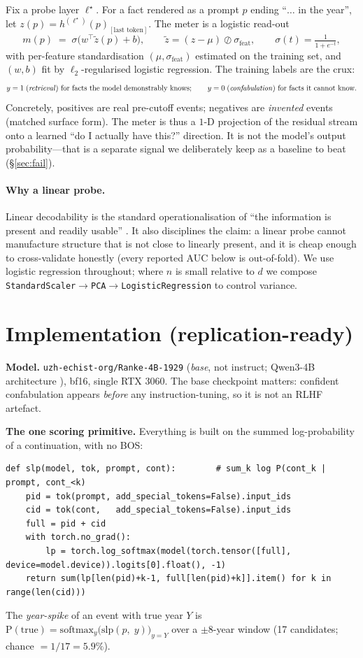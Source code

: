 \documentclass[11pt]{article}
\newcommand{\code}[1]{\texttt{\small #1}}
\begin{document}
Fix a probe layer $\ell^\star$. For a fact rendered as a prompt $p$ ending ``$\dots$ in the year'', let
$z(p)=h^{(\ell^\star)}(p)_{[\text{last token}]}$. The meter is a logistic read-out
\[
  m(p)\;=\;\sigma\!\big(w^\top \tilde z(p) + b\big),\qquad \tilde z=(z-\mu)\oslash\sigma_{\!\text{feat}},\qquad \sigma(t)=\tfrac{1}{1+e^{-t}},
\]
with per-feature standardisation $(\mu,\sigma_{\!\text{feat}})$ estimated on the training set, and $(w,b)$ fit by
$\ell_2$-regularised logistic regression. The training labels are the crux:
\[
  y=1 \;(\text{\emph{retrieval}})\ \text{for facts the model demonstrably knows};\qquad
  y=0 \;(\text{\emph{confabulation}})\ \text{for facts it cannot know.}
\]
Concretely, positives are real pre-cutoff events; negatives are \emph{invented} events (matched surface form). The meter
is thus a $1$-D projection of the residual stream onto a learned ``do I actually have this?'' direction. It is not the
model's output probability---that is a separate signal we deliberately keep as a baseline to beat (\S\ref{sec:fail}).

\paragraph{Why a linear probe.} Linear decodability is the standard operationalisation of ``the information is present
and readily usable'' \cite{alain,burns}. It also disciplines the claim: a linear probe cannot manufacture structure that
is not close to linearly present, and it is cheap enough to cross-validate honestly (every reported AUC below is
out-of-fold). We use logistic regression throughout; where $n$ is small relative to $d$ we compose
\code{StandardScaler}$\to$\code{PCA}$\to$\code{LogisticRegression} to control variance.

\section{Implementation (replication-ready)}\label{sec:impl}
\textbf{Model.} \code{uzh-echist-org/Ranke-4B-1929} (\emph{base}, not instruct; Qwen3-4B architecture \cite{qwen}),
bf16, single RTX 3060. The base checkpoint matters: confident confabulation appears \emph{before} any instruction-tuning,
so it is not an RLHF artefact.

\textbf{The one scoring primitive.} Everything is built on the summed log-probability of a continuation, with no BOS:
\begin{lstlisting}
def slp(model, tok, prompt, cont):        # sum_k log P(cont_k | prompt, cont_<k)
    pid = tok(prompt, add_special_tokens=False).input_ids
    cid = tok(cont,   add_special_tokens=False).input_ids
    full = pid + cid
    with torch.no_grad():
        lp = torch.log_softmax(model(torch.tensor([full], device=model.device)).logits[0].float(), -1)
    return sum(lp[len(pid)+k-1, full[len(pid)+k]].item() for k in range(len(cid)))
\end{lstlisting}
The \emph{year-spike} of an event with true year $Y$ is $\mathrm{P}(\text{true})=\mathrm{softmax}_y\big(\text{slp}(p,\;y)\big)_{y=Y}$
over a $\pm 8$-year window (17 candidates; chance $=1/17=5.9\%$).
\end{document}
